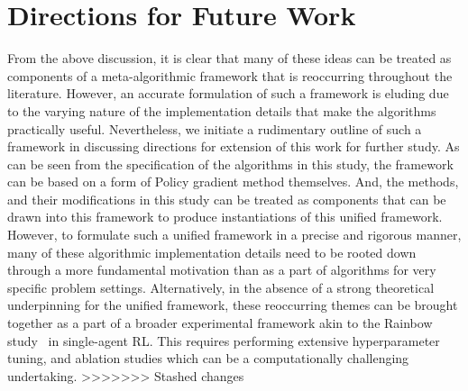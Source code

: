\section{Directions for Future Work}
From the above discussion, it is clear that many of these ideas can be treated as components of a
meta-algorithmic framework that is reoccurring throughout the literature.
However, an accurate formulation of such a framework is eluding due to the varying nature of the
implementation details that make the algorithms practically useful.
Nevertheless, we initiate a rudimentary outline of such a framework in discussing directions for
extension of this work for further study.
As can be seen from the specification of the algorithms in this study, the framework can be based
on a form of Policy gradient method themselves.
And, the methods, and their modifications in this study can be treated as components that can be
drawn into this framework to produce instantiations of this unified framework.
However, to formulate such a unified framework in a precise and rigorous manner, many of these
algorithmic implementation details need to be rooted down through a more fundamental motivation
than as a part of algorithms for very specific problem settings.
Alternatively, in the absence of a strong theoretical underpinning for the unified framework, these
reoccurring themes can be brought together as a part of a broader experimental framework akin to
the Rainbow study~ in single-agent RL.
This requires performing extensive hyperparameter tuning, and ablation studies which can be a
computationally challenging undertaking.
>>>>>>> Stashed changes
